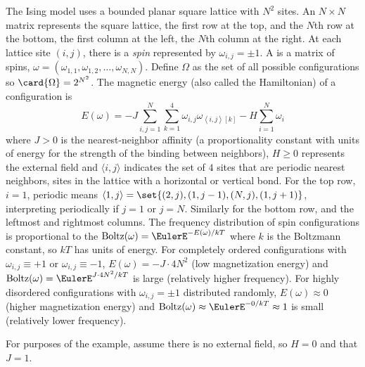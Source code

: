 \documentclass[12pt]{article}
\begin{document}
The Ising model uses a bounded planar square lattice with \( N^2 \)
sites.  An \( N \times N \) matrix represents the square lattice, the
first row at the top, and the \( N \)th row at the bottom, the first
column at the left, the \( N \)th column at the right.  At each lattice
site \( (i,j) \), there is a \emph{spin} represented by \( \omega_{i,j}
= \pm 1 \).  A  is a matrix of spins, \( \omega = (\omega_
{1,1}, \omega_{1,2}, \dots, \omega_{N,N}) \).%
Define \( \Omega \) as the set of all possible configurations so \(
\card{\Omega} = 2^{N^2} \).  The magnetic energy (also called the
Hamiltonian) of a configuration is
\[
    E(\omega) = -J \sum\limits_{i, j=1}^{N} \sum\limits_{k=1}^4 \omega_{i,
    j} \omega_{\left\langle i,j \right\rangle[k]} - H \sum\limits_{i=1}^N
    \omega_i
\] where \( J > 0 \) is the nearest-neighbor affinity (a proportionality
constant with units of energy for the strength of the binding between
neighbors), \( H \ge 0 \) represents the external field and \( \langle
i, j \rangle \) indicates the set of \( 4 \) sites that are periodic
nearest neighbors, sites in the lattice with a horizontal or vertical
bond.  For the top row, \( i = 1 \), periodic means \( \left\langle 1, j
\right\rangle = \set{(2,j), (1, j-1), (N,j), (1, j+1)} \), interpreting
periodically if \( j=1 \) or \( j=N \).  Similarly for the bottom row,
and the leftmost and rightmost columns.  The frequency distribution of
spin configurations is proportional to the %
\(
\operatorname{Boltz}
(\omega) = \EulerE^{-E(\omega)/kT} \) where \( k \) is the Boltzmann
constant, so \( kT \) has units of energy.  For completely ordered
configurations with \( \omega_{i,j} \equiv +1 \) or \( \omega_{i,j}
\equiv -1 \), \( E(\omega) = -J \cdot 4N^2 \) (low magnetization energy)
and \(
\operatorname{Boltz}
(\omega) = \EulerE^{J \cdot 4N^2/kT} \) is large (relatively higher
frequency).  For highly disordered configurations with \( \omega_{i,j} =
\pm 1 \) distributed randomly, \( E(\omega) \approx 0 \) (higher
magnetization energy) and \(
\operatorname{Boltz}
(\omega) \approx \EulerE^{-0/kT} \approx 1 \) is small (relatively lower
frequency).

For purposes of the example, assume there is no external field, so \(
H=0 \) and that \( J=1 \).
\end{document}
